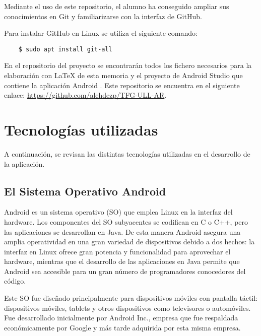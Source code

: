 Mediante el uso de este repositorio, el alumno ha conseguido ampliar sus conocimientos en Git y familiarizarse con la interfaz de GitHub.

Para instalar GitHub en Linux se utiliza el siguiente comando:
\begin{lstlisting}
    $ sudo apt install git-all
\end{lstlisting}

En el repositorio del proyecto se encontrarán todos los fichero necesarios para la elaboración con LaTeX de esta memoria y el proyecto de Android Studio que contiene la aplicación Android \ULLAR{}. Este repositorio se encuentra en el siguiente enlace: \href{https://github.com/alehdezp/TFG-ULL-AR}{https://github.com/alehdezp/TFG-ULL-AR}.


\section{Tecnologías utilizadas}

A continuación, se revisan las distintas tecnologías utilizadas en el desarrollo de la aplicación.

\subsection{El Sistema Operativo Android}

Android \cite{URL::Android} es un sistema operativo (SO) que emplea Linux en la interfaz del hardware.  Los componentes del SO subyacentes se codifican en C o C++, pero las aplicaciones se desarrollan en Java. De esta manera Android asegura una amplia operatividad en una gran variedad de dispositivos debido a dos hechos: la interfaz en Linux ofrece gran potencia y funcionalidad para aprovechar el hardware, mientras que el desarrollo de las aplicaciones en Java permite que Android sea accesible para un gran número de programadores conocedores del código.

Este SO fue diseñado principalmente para dispositivos móviles con pantalla táctil: dispositivos móviles, tablets y otros dispositivos como televisores o automóviles. Fue desarrollado inicialmente por Android Inc., empresa que fue respaldada económicamente por Google y más tarde adquirida por esta misma empresa.


